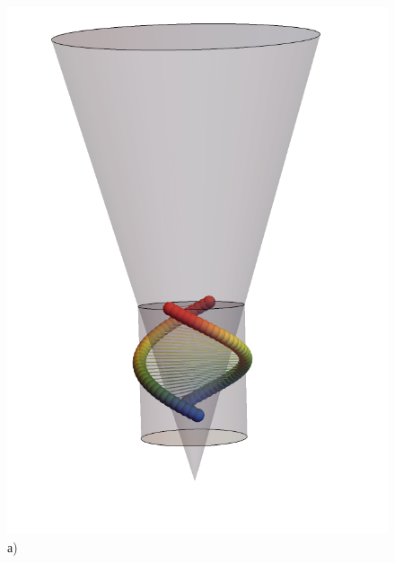 \documentclass[
11pt,
master, %
subf, %
href, %
colorlinks=true, %
]{disser}
\begin{document}
\newpage
\begin{figure}[h!]
	\begin{minipage}[h]{0.44\linewidth}
		\centering
		\includegraphics[width=1\linewidth]{vis1} \\ а)
	\end{minipage}
	\hfill
	\begin{minipage}[h]{0.4\linewidth}
		\centering

\end{minipage}
\end{figure}
\end{document}
